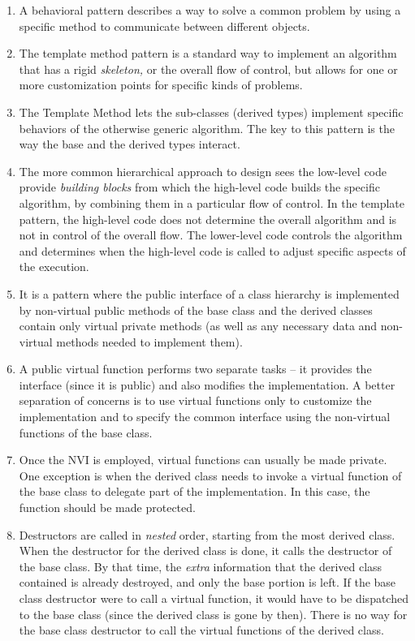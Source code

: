 \begin{enumerate}
\item
  A behavioral pattern describes a way to solve a common problem by using a specific method to communicate between different objects.
\item
  The template method pattern is a standard way to implement an algorithm that has a rigid \emph{skeleton,} or the overall flow of control, but allows for one or more customization points for specific kinds of problems.
\item
  The Template Method lets the sub-classes (derived types) implement specific behaviors of the otherwise generic algorithm. The key to this pattern is the way the base and the derived types interact.
\item
  The more common hierarchical approach to design sees the low-level code provide \emph{building blocks} from which the high-level code builds the specific algorithm, by combining them in a particular flow of control. In the template pattern, the high-level code does not determine the overall algorithm and is not in control of the overall flow. The lower-level code controls the algorithm and determines when the high-level code is called to adjust specific aspects of the execution.
\item
  It is a pattern where the public interface of a class hierarchy is implemented by non-virtual public methods of the base class and the derived classes contain only virtual private methods (as well as any necessary data and non-virtual methods needed to implement them).
\item
  A public virtual function performs two separate tasks -- it provides the interface (since it is public) and also modifies the implementation. A better separation of concerns is to use virtual functions only to customize the implementation and to specify the common interface using the non-virtual functions of the base class.
\item
  Once the NVI is employed, virtual functions can usually be made private. One exception is when the derived class needs to invoke a virtual function of the base class to delegate part of the implementation. In this case, the function should be made protected.
\item
  Destructors are called in \emph{nested} order, starting from the most derived class. When the destructor for the derived class is done, it calls the destructor of the base class. By that time, the \emph{extra} information that the derived class contained is already destroyed, and only the base portion is left. If the base class destructor were to call a virtual function, it would have to be dispatched to the base class (since the derived class is gone by then). There is no way for the base class destructor to call the virtual functions of the derived class.

\end{enumerate}
